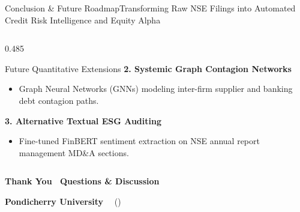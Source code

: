 \begin{frame}{Conclusion \& Future Roadmap}{Transforming Raw NSE Filings into Automated Credit Risk Intelligence and Equity Alpha}
\begin{columns}[T]
\begin{column}{0.485\textwidth}
\begin{quantcard}[height=4.2cm]{Future Quantitative Extensions}
                \vspace{2pt}
                \textbf{\color{deepemerald}2. Systemic Graph Contagion Networks}
                \begin{itemize}
                    \setlength{\itemsep}{1.5pt}
                    \item Graph Neural Networks (GNNs) modeling inter-firm supplier and banking debt contagion paths.
                \end{itemize}

                \vspace{2pt}
                \textbf{\color{deepemerald}3. Alternative Textual ESG Auditing}
                \begin{itemize}
                    \setlength{\itemsep}{1.5pt}
                    \item Fine-tuned FinBERT sentiment extraction on NSE annual report management MD\&A sections.
                \end{itemize}
                \vfill
            \end{quantcard}
        \end{column}
    \end{columns}

    \vspace{0.25cm}

    \begin{tcolorbox}[
        enhanced,
        colback=deepemerald,
        colframe=forestgreen,
        boxrule=0.8pt,
        arc=4pt,
        width=\textwidth,
        left=8pt, right=8pt, top=6pt, bottom=6pt
    ]
        \centering
        {\fontsize{10pt}{12pt}\selectfont\bfseries\color{white}Thank You \textbar\ Questions \& Discussion}\par
        \vspace{2pt}
        {\fontsize{7pt}{8.5pt}\selectfont\color{minttint}
            \textbf{Pondicherry University} \textbar\ \DepartmentName\ (\ProgramName) \textbar\ \PresentationTitle
        }
    \end{tcolorbox}
\end{frame}
